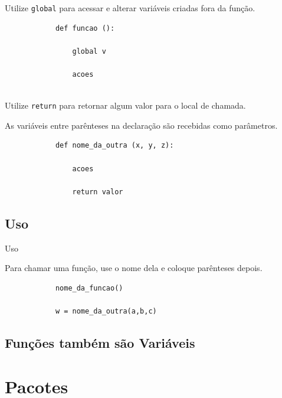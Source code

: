 	\begin{frame}[containsverbatim]
		
		Utilize \texttt{global} para acessar e alterar variáveis criadas fora da função.
		
		\begin{verbatim}
			def funcao ():
			
				global v
				
				acoes				
			
		\end{verbatim}
		
	\end{frame}
	
	\begin{frame}[containsverbatim]
		
		Utilize \texttt{return} para retornar algum valor para o local de chamada.				
		
		As variáveis entre parênteses na declaração são recebidas como parâmetros.
		
		\begin{verbatim}
			def nome_da_outra (x, y, z):
			
				acoes
				
				return valor
		\end{verbatim}
		
	\end{frame}
	
	
	
	\subsection{Uso}
	
	\begin{frame}[containsverbatim]{Uso}
		
		Para chamar uma função, use o nome dela e coloque parênteses depois.
		
		\begin{verbatim}
			nome_da_funcao()						
			
			w = nome_da_outra(a,b,c)
		\end{verbatim}
		
	\end{frame}
	
	\subsection{Funções também são Variáveis}

\section{Pacotes}

